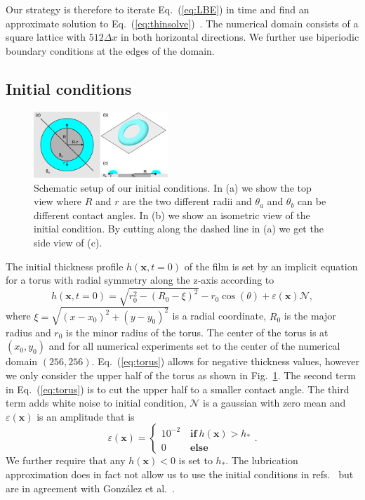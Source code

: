 \documentclass[twoside,twocolumn,9pt]{article}
\begin{document}
Our strategy is therefore to iterate Eq.~(\ref{eq:LBE}) in time and find an approximate solution to Eq.~(\ref{eq:thinsolve})~\cite{zitzSwalbeJlLattice2022}.
The numerical domain consists of a square lattice with $512\Delta x$ in both horizontal directions.
We further use biperiodic boundary conditions at the edges of the domain. 

\subsection{Initial conditions}
\begin{figure}
\centering
  \includegraphics[width=0.45\textwidth]{ringrivulet_shema}
  \caption{Schematic setup of our initial conditions. In (a) we show the top view where $R$ and $r$ are the two different radii and $\theta_a$ and $\theta_b$ can be different contact angles. 
  In (b) we show an isometric view of the initial condition.
  By cutting along the dashed line in (a) we get the side view of (c).}
  \label{fig:ringschema}
\end{figure}

The initial thickness profile $h(\mathbf{x}, t=0)$ of the film is set by an implicit equation for a torus with radial symmetry along the z-axis according to
\begin{equation}\label{eq:torus}
    h(\mathbf{x}, t=0) = \sqrt{r_0^2 - \left(R_0-\xi\right)^2} - r_0\cos(\theta) + \varepsilon(\mathbf{x})\mathcal{N},
\end{equation}
where $\xi = \sqrt{(x-x_0)^2+(y-y_0)^2}$ is a radial coordinate, $R_0$ is the major radius and $r_0$ is the minor radius of the torus.
The center of the torus is at $(x_0,y_0)$ and for all numerical experiments set to the center of the numerical domain $(256,256)$.
Eq.~(\ref{eq:torus}) allows for negative thickness values, however we only consider the upper half of the torus as shown in Fig.~\ref{fig:ringschema}. 
The second term in Eq.~(\ref{eq:torus}) is to cut the upper half to a smaller contact angle.
The third term adds white noise to initial condition, $\mathcal{N}$ is a gaussian with zero mean and $\varepsilon(\mathbf{x})$ is an amplitude that is 
\begin{equation}
    \varepsilon(\mathbf{x}) =
    \begin{cases}
        10^{-2}\quad \textbf{if}~h(\mathbf{x}) > h_{\ast}\\
        0~~\quad\quad \textbf{else}
    \end{cases}
    .
\end{equation} 
We further require that any $h(\mathbf{x}) < 0$ is set to $h_{\ast}$.
The lubrication approximation does in fact not allow us to use the initial conditions in refs.~\cite{nguyenCompetitionCollapseBreakup2012, wuBreakupPatternedNanoscale2010} but are in agreement with Gonz{\'a}lez et al.~\cite{gonzalezStabilityLiquidRing2013}.
\end{document}
